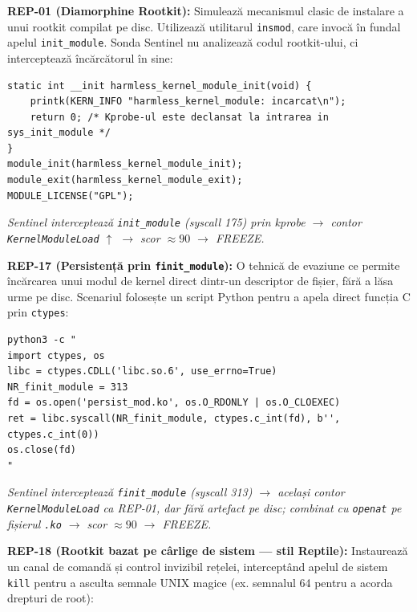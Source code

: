 \par \textbf{REP-01 (Diamorphine Rootkit):} Simulează mecanismul clasic de instalare a unui rootkit compilat pe disc. Utilizează utilitarul \texttt{insmod}, care invocă în fundal apelul \texttt{init\_module}. Sonda Sentinel nu analizează codul rootkit-ului, ci interceptează încărcătorul în sine:

\begin{lstlisting}[style=cstyle,caption={REP-01: Modul de kernel inofensiv pentru declanșarea intercepției LKM}]
static int __init harmless_kernel_module_init(void) {
    printk(KERN_INFO "harmless_kernel_module: incarcat\n");
    return 0; /* Kprobe-ul este declansat la intrarea in sys_init_module */
}
module_init(harmless_kernel_module_init);
module_exit(harmless_kernel_module_exit);
MODULE_LICENSE("GPL");
\end{lstlisting}
\par\textit{Sentinel interceptează \texttt{init\_module} (syscall 175) prin kprobe $\rightarrow$ contor \texttt{KernelModuleLoad} $\uparrow$ $\rightarrow$ scor $\approx 90$ $\rightarrow$ FREEZE.}

\par \textbf{REP-17 (Persistență prin \texttt{finit\_module}):} O tehnică de evaziune ce permite încărcarea unui modul de kernel direct dintr-un descriptor de fișier, fără a lăsa urme pe disc. Scenariul folosește un script Python pentru a apela direct funcția C prin \texttt{ctypes}:

\begin{lstlisting}[style=bashstyle,caption={REP-17: Apelarea finit\_module via ctypes în Python}]
python3 -c "
import ctypes, os
libc = ctypes.CDLL('libc.so.6', use_errno=True)
NR_finit_module = 313
fd = os.open('persist_mod.ko', os.O_RDONLY | os.O_CLOEXEC)
ret = libc.syscall(NR_finit_module, ctypes.c_int(fd), b'', ctypes.c_int(0))
os.close(fd)
"
\end{lstlisting}
\par\textit{Sentinel interceptează \texttt{finit\_module} (syscall 313) $\rightarrow$ același contor \texttt{KernelModuleLoad} ca REP-01, dar fără artefact pe disc; combinat cu \texttt{openat} pe fișierul \texttt{.ko} $\rightarrow$ scor $\approx 90$ $\rightarrow$ FREEZE.}

\par \textbf{REP-18 (Rootkit bazat pe cârlige de sistem --- stil Reptile):} Instaurează un canal de comandă și control invizibil rețelei, interceptând apelul de sistem \texttt{kill} pentru a asculta semnale UNIX magice (ex. semnalul 64 pentru a acorda drepturi de root):

